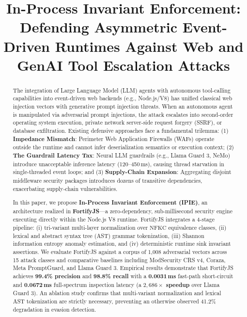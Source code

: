 \documentclass[conference]{IEEEtran}
\begin{document}
\title{In-Process Invariant Enforcement: Defending Asymmetric Event-Driven Runtimes Against Web and GenAI Tool Escalation Attacks}

\author{
}

\maketitle

\begin{abstract}
The integration of Large Language Model (LLM) agents with autonomous tool-calling capabilities into event-driven web backends (e.g., Node.js/V8) has unified classical web injection vectors with generative prompt injection threats. When an autonomous agent is manipulated via adversarial prompt injections, the attack escalates into second-order operating system execution, private network server-side request forgery (SSRF), or database exfiltration. Existing defensive approaches face a fundamental trilemma: (1) \textbf{Impedance Mismatch}: Perimeter Web Application Firewalls (WAFs) operate outside the runtime and cannot infer deserialization semantics or execution context; (2) \textbf{The Guardrail Latency Tax}: Neural LLM guardrails (e.g., Llama Guard 3, NeMo) introduce unacceptable inference latency (120--450\,ms), causing thread starvation in single-threaded event loops; and (3) \textbf{Supply-Chain Expansion}: Aggregating disjoint middleware security packages introduces dozens of transitive dependencies, exacerbating supply-chain vulnerabilities.

In this paper, we propose \textbf{In-Process Invariant Enforcement (IPIE)}, an architecture realized in \textbf{FortifyJS}---a zero-dependency, sub-millisecond security engine executing directly within the Node.js V8 runtime. FortifyJS integrates a 4-stage pipeline: (i) tri-variant multi-layer normalization over $\text{NFKC}$ equivalence classes, (ii) lexical and abstract syntax tree (AST) grammar tokenization, (iii) Shannon information entropy anomaly estimation, and (iv) deterministic runtime sink invariant assertions. We evaluate FortifyJS against a corpus of 1,008 adversarial vectors across 15 attack classes and comparative baselines including ModSecurity CRS v4, Coraza, Meta PromptGuard, and Llama Guard 3. Empirical results demonstrate that FortifyJS achieves \textbf{99.4\% precision} and \textbf{98.8\% recall} with a \textbf{0.0031\,ms} fast-path short-circuit and \textbf{0.0672\,ms} full-spectrum inspection latency (a \textbf{$2,686\times$ speedup} over Llama Guard 3). An ablation study confirms that multi-variant normalization and lexical AST tokenization are strictly necessary, preventing an otherwise observed 41.2\% degradation in evasion detection.
\end{abstract}
\end{document}
